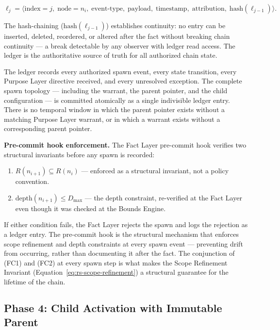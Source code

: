 \begin{equation}
\ell_j = \bigl\langle
\text{index}=j,\;
\text{node}=n_i,\;
\text{event-type},\;
\text{payload},\;
\text{timestamp},\;
\text{attribution},\;
\text{hash}(\ell_{j-1})
\bigr\rangle .
\label{eq:ledger-entry}
\end{equation}

The hash-chaining ($\text{hash}(\ell_{j-1})$) establishes continuity: no entry can be inserted, deleted, reordered, or altered after the fact without breaking chain continuity — a break detectable by any observer with ledger read access. The ledger is the authoritative source of truth for all authorized chain state.

The ledger records every authorized spawn event, every state transition, every Purpose Layer directive received, and every unresolved exception. The complete spawn topology — including the warrant, the parent pointer, and the child configuration — is committed atomically as a single indivisible ledger entry. There is no temporal window in which the parent pointer exists without a matching Purpose Layer warrant, or in which a warrant exists without a corresponding parent pointer.

\medskip
\noindent\textbf{Pre-commit hook enforcement.} The Fact Layer pre-commit hook verifies two structural invariants before any spawn is recorded:

\begin{enumerate}
    \item[(FC1)] $R(n_{i+1}) \subseteq R(n_i)$ — enforced as a structural invariant, not a policy convention.
    \item[(FC2)] $\text{depth}(n_{i+1}) \leq D_{\max}$ — the depth constraint, re-verified at the Fact Layer even though it was checked at the Bounds Engine.
\end{enumerate}

If either condition fails, the Fact Layer rejects the spawn and logs the rejection as a ledger entry. The pre-commit hook is the structural mechanism that enforces scope refinement and depth constraints at every spawn event — preventing drift from occurring, rather than documenting it after the fact. The conjunction of (FC1) and (FC2) at every spawn step is what makes the Scope Refinement Invariant (Equation~\ref{eq:rs-scope-refinement}) a structural guarantee for the lifetime of the chain.

\subsection{Phase 4: Child Activation with Immutable Parent}
\label{sec:rs-phase4}

